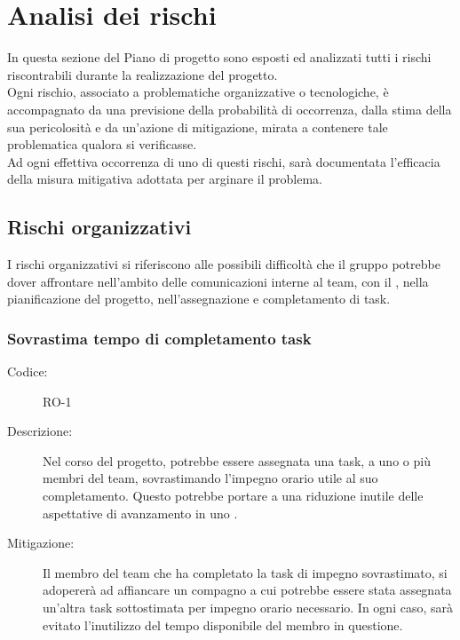 \chapter{Analisi dei rischi}\label{chap:rischi}

In questa sezione del Piano di progetto sono esposti ed analizzati tutti i rischi riscontrabili durante la realizzazione del progetto.\\Ogni rischio, associato a problematiche organizzative o tecnologiche, è accompagnato da una previsione della probabilità di occorrenza, dalla stima della sua pericolosità e da un'azione di mitigazione, mirata a contenere tale problematica qualora si verificasse.\\Ad ogni effettiva occorrenza di uno di questi rischi, sarà documentata l'efficacia della misura mitigativa adottata per arginare il problema.

\section{Rischi organizzativi}
I rischi organizzativi si riferiscono alle possibili difficoltà che il gruppo potrebbe dover affrontare nell'ambito delle comunicazioni interne al team, con il , nella pianificazione del progetto, nell'assegnazione e completamento di task.

\subsection*{Sovrastima tempo di completamento task}
\begin{description}
    \item[Codice:] RO-1
    \item[Descrizione:] Nel corso del progetto, potrebbe essere assegnata una task, a uno o più membri del team, sovrastimando l'impegno orario utile al suo completamento. Questo potrebbe portare a una riduzione inutile delle aspettative di avanzamento in uno .
    \item[Mitigazione:] Il membro del team che ha completato la task di impegno sovrastimato, si adopererà ad affiancare un compagno a cui potrebbe essere stata assegnata un'altra task sottostimata per impegno orario necessario. In ogni caso, sarà evitato l'inutilizzo del tempo disponibile del membro in questione.
\end{description}

